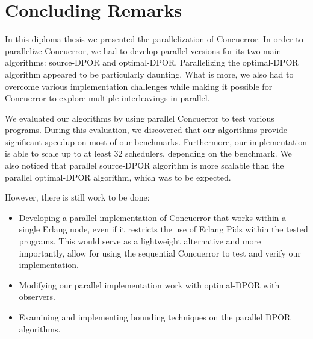 \chapter{Concluding Remarks}

In this diploma thesis we presented the parallelization of Concuerror. In order to parallelize Concuerror, we had to develop parallel versions for its two main algorithms: source-DPOR and optimal-DPOR. Parallelizing the optimal-DPOR algorithm appeared to be particularly daunting.
What is more, we also had to overcome various implementation challenges while making it possible for Concuerror to explore multiple interleavings in parallel.

We evaluated our algorithms by using parallel Concuerror to test various programs. During this evaluation, we discovered that our algorithms provide significant speedup on most of our benchmarks. Furthermore, our implementation is able to scale up to at least 32 schedulers, depending on the benchmark. We also noticed that parallel source-DPOR algorithm is more scalable than the parallel optimal-DPOR algorithm, which was to be expected. 


However, there is still work to be done:

\begin{itemize}

\item Developing a parallel implementation of Concuerror that works within a single Erlang node, even if it restricts the use of Erlang Pids within the tested programs. This would serve as a lightweight alternative and more importantly, allow for using the sequential Concuerror to test and verify our implementation. 

\item Modifying our parallel implementation work with optimal-DPOR with observers.

\item Examining and implementing bounding techniques on the parallel DPOR algorithms.


\end{itemize}
